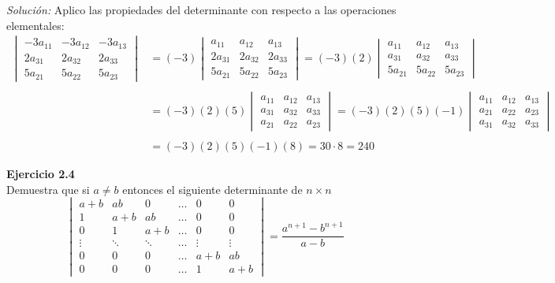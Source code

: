\documentclass{article}
\newenvironment{problem}[2][Ejercicio]
    { \begin{mdframed}[backgroundcolor=gray!20] \textbf{#1 #2} \\}
    {  \end{mdframed}}
\newenvironment{solution}
    {\textit{Solución:}}
    {}
\begin{document}
\begin{solution}
Aplico las propiedades del determinante con respecto a las operaciones elementales:
\[
\begin{aligned}
\begin{vmatrix}
-3a_{11} & -3a_{12} & -3a_{13} \\
2a_{31} & 2a_{32} & 2a_{33} \\
5a_{21} & 5a_{22} & 5a_{23}
\end{vmatrix} &= (-3)
\begin{vmatrix}
a_{11} & a_{12} & a_{13} \\
2a_{31} & 2a_{32} & 2a_{33} \\
5a_{21} & 5a_{22} & 5a_{23}
\end{vmatrix} = (-3)(2)  
\begin{vmatrix}
a_{11} & a_{12} & a_{13} \\
a_{31} & a_{32} & a_{33} \\
5a_{21} & 5a_{22} & 5a_{23}
\end{vmatrix} \\ \\
&= (-3)(2)(5)
\begin{vmatrix}
a_{11} & a_{12} & a_{13} \\
a_{31} & a_{32} & a_{33} \\
a_{21} & a_{22} & a_{23}
\end{vmatrix} = (-3)(2)(5)(-1) 
\begin{vmatrix}
a_{11} & a_{12} & a_{13} \\
a_{21} & a_{22} & a_{23} \\
a_{31} & a_{32} & a_{33}
\end{vmatrix} \\ \\
&= (-3)(2)(5)(-1)(8) = 30\cdot 8 = 240
\end{aligned}
\]
\end{solution}
\begin{problem}{2.4}
    
    Demuestra que si $a\neq b$ entonces el siguiente determinante de $n\times n$
    \[
    \begin{vmatrix}
    a+ b & ab & 0 & \dots & 0 & 0 \\
    1 & a+b & ab & \dots & 0 & 0 \\
    0 & 1 & a+b & \dots & 0 & 0 \\
    \vdots & \ddots & \ddots & \dots & \vdots & \vdots \\
    0 & 0 & 0 & \dots & a+b & ab \\
    0 & 0 & 0 & \dots & 1 & a+b
    \end{vmatrix} =
    \frac{a^{n+1}-b^{n+1}}{a-b}
    \]
\end{problem}
\end{document}
